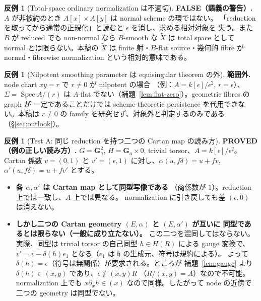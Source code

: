 \documentclass[11pt,a4paper]{article}
\numberwithin{equation}{section}
\theoremstyle{definition}
\newtheorem{counterexample}[definition]{反例}
\newcommand{\h}{\mathfrak h}
\newcommand{\tX}{\widetilde X}
\begin{document}
\begin{counterexample}[Total-space ordinary normalization は不適切]\label{cex:total}
\textbf{FALSE（語義の警告）.}
$A$ が非被約のとき $A[x]\times A[y]$ は normal scheme の環ではない。
「reduction を取ってから通常の正規化」と読むと $\epsilon$ を消し、求める相対対象を
失う。また $B$ が reduced でも non-normal なら $B$-smooth な $\tX$ は total space
として normal とは限らない。本稿の $\tX$ は finite 射・$B$-flat source・幾何的
fibre が normal・fibrewise normalization という相対的意味である。
\end{counterexample}

\begin{counterexample}[Nilpotent smoothing parameter は equisingular theorem の外]
\label{cex:smoothing}
\textbf{範囲外.} node chart $xy=r$ で $r\ne0$ が nilpotent の場合
（例：$A=k[\epsilon]/\epsilon^2$, $r=\epsilon$）、$\Sigma=\operatorname{Spec}A/(r)$
は $A$-flat でない（補題~\ref{lem:flat-zero}）。geometric fibres の graph が
一定であることだけでは scheme-theoretic persistence を代用できない。本稿は
$r\ne0$ の family を研究せず、対象外と判定するのみである（\S\ref{sec:outlook}）。
\end{counterexample}

\begin{counterexample}[Test A: 同じ reduction を持つ二つの Cartan map の読み方]
\label{cex:testA}
\textbf{PROVED（例の正しい読み方）.}
$G=\mathbf G_a^2$, $H=\mathbf G_a\times0$, trivial torsor、$A=k[\epsilon]/\epsilon^2$。
Cartan 係数 $v=(0,1)$ と $v'=(\epsilon,1)$ に対し、$\alpha(u,f\delta)=u+fv$,
$\alpha'(u,f\delta)=u+fv'$ とする。
\begin{itemize}
\item \textbf{各 $\alpha,\alpha'$ は Cartan map として同型写像である}
  （商係数が $1$）。reduction 上では一致し、$A$ 上では異なる。
  normalization に引き戻しても差 $(\epsilon,0)$ は消えない。
\item \textbf{しかし二つの Cartan geometry $(E,\alpha)$ と $(E,\alpha')$ が互いに
  同型であるとは限らない（一般に成り立たない）。} この二つを混同してはならない。
  実際、同型は trivial torsor の自己同型 $h\in H(R)$ による gauge 変換で、
  $v'=v-\delta(h)e_1$ となる（$e_1$ は $\h$ の生成元、符号は規約による）。
  よって $\delta(h)=\epsilon$（符号は無関係）が要求される。ところが
  補題~\ref{lem:gauge} より $\delta(h)\in(x,y)$ であり、$\epsilon\notin(x,y)R$
  （$R/(x,y)=A$）なので不可能。normalization 上でも $x\partial_xh\in(x)$
  なので同様。したがって node の近傍で二つの geometry は同型でない。
\end{itemize}
\end{counterexample}
\end{document}
